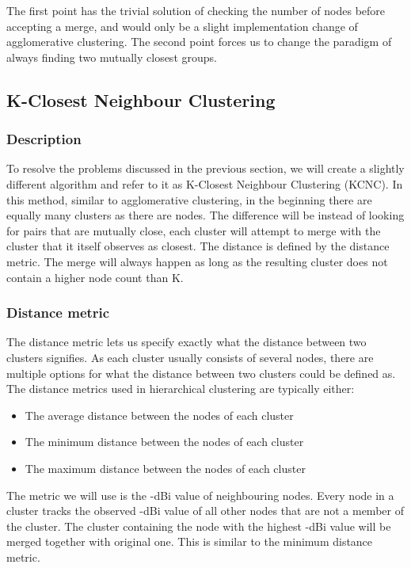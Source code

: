 The first point has the trivial solution of checking the number of nodes before accepting a merge,  and would only be a slight implementation change of agglomerative clustering. 
The second point forces us to change the paradigm of always finding two mutually closest groups. 

\subsection{K-Closest Neighbour Clustering}
\subsubsection{Description}
To resolve the problems discussed in the previous section, we will create a slightly different algorithm and refer to it as K-Closest Neighbour Clustering (KCNC). 
In this method, similar to agglomerative clustering, in the beginning there are equally many clusters as there are nodes. The difference will be instead of looking for pairs that are mutually close,
each cluster will attempt to merge with the cluster that it itself observes as closest.
The distance is defined by the distance metric. The merge will always happen as long as the resulting cluster does not contain a higher node count than K.

\subsubsection{Distance metric}
The distance metric lets us specify exactly what the distance between two clusters signifies. As each cluster usually consists of several nodes, there are multiple
options for what the distance between two clusters could be defined as. The distance metrics used in hierarchical clustering are typically either:

\begin{itemize}
	\itemsep0em 
	\item The average distance between the nodes of each cluster
	\item The minimum distance between the nodes of each cluster
	\item The maximum distance between the nodes of each cluster
\end{itemize}

The metric we will use is the -dBi value of neighbouring nodes. Every node in a cluster tracks the observed -dBi value of all other nodes that are not a member of the cluster.
The cluster containing the node with the highest -dBi value will be merged together with original one. This is similar to the minimum distance metric. 

